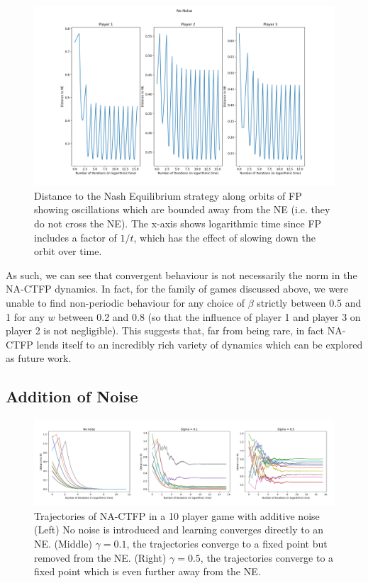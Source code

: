 \documentclass{article}
\theoremstyle{definition}
\begin{document}
  \begin{figure}[t]
    \centering
    \includegraphics[width = 0.7 \textwidth]{Figures/3PlayerChainNoNoise.png}
    \caption{\label{fig::3PlayerChainNoNoise} Distance to the Nash Equilibrium strategy along orbits
    of FP showing oscillations which are bounded away from the NE (i.e. they do not cross the NE).
    The x-axis shows logarithmic time since FP includes a factor of $1/t$, which has the effect of
    slowing down the orbit over time.}
  \end{figure}

  As such, we can see that convergent behaviour is not necessarily the norm in the NA-CTFP dynamics. In fact, for the family of games discussed above, we were unable to find non-periodic behaviour for any choice of $\beta$ strictly between 0.5 and 1 for any $w$ between 0.2 and 0.8 (so that the influence of player 1 and player 3 on player 2 is not negligible). This suggests that, far from being rare, in fact NA-CTFP lends itself to an incredibly rich variety of dynamics which can be explored as future work.
  

  \subsection{Addition of Noise}

  \begin{figure}[t]
    \centering
    \includegraphics[width = \columnwidth]{Figures/Noise10Player.png}
    \caption{\label{fig::Noise10Player} Trajectories of NA-CTFP in a 10 player game with additive noise (Left) No noise is introduced and learning converges directly to an NE. (Middle) $\gamma = 0.1$, the trajectories converge to a fixed point but removed from the NE. (Right) $\gamma = 0.5$, the trajectories converge to a fixed point which is even further away from the NE.}
  \end{figure}
\end{document}
